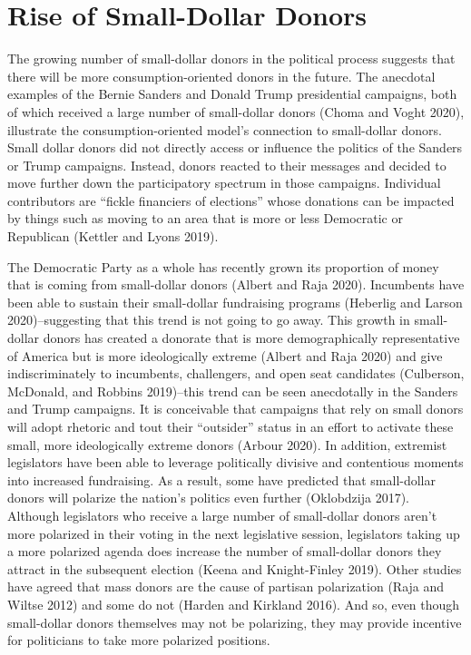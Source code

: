 \documentclass[12pt,]{article}
\begin{document}
\hypertarget{rise-of-small-dollar-donors}{%
\section{Rise of Small-Dollar
Donors}\label{rise-of-small-dollar-donors}}

The growing number of small-dollar donors in the political process
suggests that there will be more consumption-oriented donors in the
future. The anecdotal examples of the Bernie Sanders and Donald Trump
presidential campaigns, both of which received a large number of
small-dollar donors (Choma and Voght 2020), illustrate the
consumption-oriented model's connection to small-dollar donors. Small
dollar donors did not directly access or influence the politics of the
Sanders or Trump campaigns. Instead, donors reacted to their messages
and decided to move further down the participatory spectrum in those
campaigns. Individual contributors are ``fickle financiers of
elections'' whose donations can be impacted by things such as moving to
an area that is more or less Democratic or Republican (Kettler and Lyons
2019).

The Democratic Party as a whole has recently grown its proportion of
money that is coming from small-dollar donors (Albert and Raja 2020).
Incumbents have been able to sustain their small-dollar fundraising
programs (Heberlig and Larson 2020)--suggesting that this trend is not
going to go away. This growth in small-dollar donors has created a
donorate that is more demographically representative of America but is
more ideologically extreme (Albert and Raja 2020) and give
indiscriminately to incumbents, challengers, and open seat candidates
(Culberson, McDonald, and Robbins 2019)--this trend can be seen
anecdotally in the Sanders and Trump campaigns. It is conceivable that
campaigns that rely on small donors will adopt rhetoric and tout their
``outsider'' status in an effort to activate these small, more
ideologically extreme donors (Arbour 2020). In addition, extremist
legislators have been able to leverage politically divisive and
contentious moments into increased fundraising. As a result, some have
predicted that small-dollar donors will polarize the nation's politics
even further (Oklobdzija 2017). Although legislators who receive a large
number of small-dollar donors aren't more polarized in their voting in
the next legislative session, legislators taking up a more polarized
agenda does increase the number of small-dollar donors they attract in
the subsequent election (Keena and Knight-Finley 2019). Other studies
have agreed that mass donors are the cause of partisan polarization
(Raja and Wiltse 2012) and some do not (Harden and Kirkland 2016). And
so, even though small-dollar donors themselves may not be polarizing,
they may provide incentive for politicians to take more polarized
positions.
\end{document}

